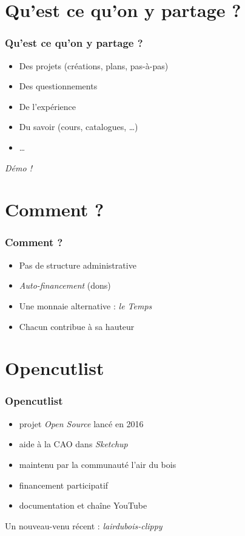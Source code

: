 \section{Qu'est ce qu'on y partage ?}

\begin{frame}
  \frametitle{Qu'est ce qu'on y partage ?}

  \begin{itemize}
    \item Des projets (créations, plans, pas-à-pas)
    \item Des questionnements
    \item De l'expérience
    \item Du savoir (cours, catalogues, \dots)
    \item \dots
  \end{itemize}

  \quad
  \begin{center}
    \emph{Démo !}
  \end{center}
\end{frame}

\section{Comment ?}

\begin{frame}
  \frametitle{Comment ?}

  \begin{itemize}
    \item Pas de structure administrative
    \item \emph{Auto-financement} (dons)
    \item Une monnaie alternative : \emph{le Temps}
    \item Chacun contribue à sa hauteur
  \end{itemize}
\end{frame}

\section{Opencutlist}

\begin{frame}
  \frametitle{Opencutlist}

  \begin{itemize}
    \item projet \emph{Open Source} lancé en 2016
    \item aide à la CAO dans \emph{Sketchup}
    \item maintenu par la communauté l'air du bois
    \item financement participatif
    \item documentation et chaîne YouTube
  \end{itemize}

  \bigskip

  Un nouveau-venu récent : \emph{lairdubois-clippy}
\end{frame}

